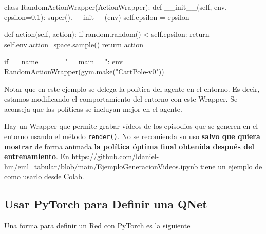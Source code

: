 \documentclass[a4paper, 11pt]{article}
\begin{document}
\begin{pyverbatim}[][frame=single, fontsize=\scriptsize]
class RandomActionWrapper(ActionWrapper):
    def __init__(self, env, epsilon=0.1):
        super().__init__(env)
        self.epsilon = epsilon
        
	def action(self, action):
		if random.random() < self.epsilon:
            return self.env.action_space.sample()
        return action
        
if __name__ == "__main__":
    env = RandomActionWrapper(gym.make("CartPole-v0"))
\end{pyverbatim} 

Notar que en este ejemplo se delega la política del agente en el entorno. Es decir, estamos modificando el comportamiento del entorno con este Wrapper. Se aconseja que las políticas se incluyan mejor en el agente.

Hay un Wrapper que permite grabar vídeos de los episodios que se generen en el entorno usando el método \texttt{render()}. No se recomienda su uso \textbf{salvo que quiera mostrar} de forma animada \textbf{la política óptima final obtenida después del entrenamiento}. En \url{https://github.com/ldaniel-hm/eml_tabular/blob/main/EjemploGeneracionVideos.ipynb} tiene un ejemplo de como usarlo desde Colab. 



\subsection{Usar PyTorch para Definir una QNet}

Una forma para definir un Red con  PyTorch es la siguiente
\end{document}
